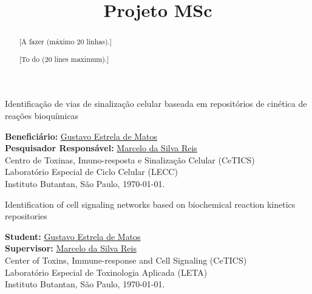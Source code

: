 \documentclass[12pt]{article}
\title{Projeto MSc}
\begin{document}
%
\doublespacing

\thispagestyle{empty} 
\begin{flushright}
    {\LARGE Identificação de vias de sinalização celular baseada em repositórios de cinética de reações bioquímicas}

  \bigskip
  \bigskip
        
  {\large {\bf Beneficiário:} \href{mailto:gustavo.estrela.matos@usp.br}{Gustavo Estrela de Matos}\\ 
  {\bf Pesquisador Responsável:} \href{mailto:marcelo.reis@butantan.gov.br}{Marcelo da Silva Reis}\\
  \bigskip
Centro de Toxinas, Imuno-resposta e Sinalização Celular (CeTICS)\\
Laboratório Especial de Ciclo Celular (LECC)\\
  Instituto Butantan, São Paulo, \today.\\
  }

  \bigskip
  \bigskip
\end{flushright}
\begin{abstract}
{\color{blue}[A fazer (máximo 20 linhas).]}
\end{abstract}

\newpage
\thispagestyle{empty} 
\begin{flushright}
    {\LARGE Identification of cell signaling networks based on biochemical reaction kinetics repositories}

  \bigskip
  \bigskip
        
  {\large {\bf Student:} \href{mailto:gustavo.estrela.matos@usp.br}{Gustavo Estrela de Matos}\\ 
  {\bf Supervisor:} \href{mailto:marcelo.reis@butantan.gov.br}{Marcelo da Silva Reis}\\
  \bigskip
Center of Toxins, Immune-response and Cell Signaling (CeTICS)\\
Laboratório Especial de Toxinologia Aplicada (LETA)\\
  Instituto Butantan, São Paulo, \today.\\
  }
  \bigskip
  \bigskip
\end{flushright}
\begin{abstract}
{\color{blue}[To do (20 lines maximum).]}
\end{abstract}

\newpage
{}
\tableofcontents
\newpage
\end{document}
